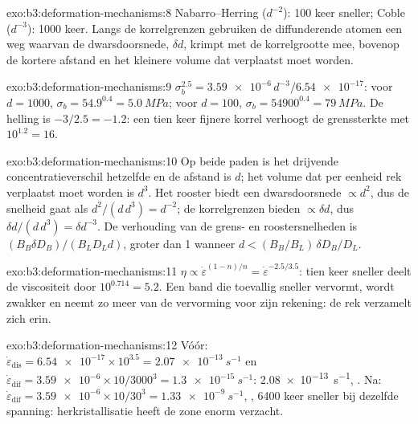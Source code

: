 \begin{solution}{exo:b3:deformation-mechanisms:8}
Nabarro--Herring ($d^{-2}$): 100 keer sneller; Coble ($d^{-3}$): 1000 keer.
Langs de korrelgrenzen gebruiken de diffunderende atomen een weg waarvan de dwarsdoorsnede, $\delta
d$, krimpt met de korrelgrootte mee, bovenop de kortere afstand en het kleinere
volume dat verplaatst moet worden.
\end{solution}

\begin{solution}{exo:b3:deformation-mechanisms:9}
$\sigma_b^{2.5} = \num{3.59e-6}\,d^{-3}/\num{6.54e-17}$: voor $d = 1000$,
$\sigma_b = 54.9^{0.4} = \qty{5.0}{MPa}$; voor $d = 100$, $\sigma_b =
\num{54900}^{0.4} = \qty{79}{MPa}$. De helling is $-3/2.5 = -1.2$: een tien keer
fijnere korrel verhoogt de grenssterkte met $10^{1.2} = 16$.
\end{solution}

\begin{solution}{exo:b3:deformation-mechanisms:10}
Op beide paden is het drijvende concentratieverschil hetzelfde en de
afstand is $d$; het volume dat per eenheid rek verplaatst moet worden is $d^3$. Het rooster
biedt een dwarsdoorsnede $\propto d^2$, dus de snelheid gaat als $d^2/(d\,d^3) =
d^{-2}$; de korrelgrenzen bieden $\propto\delta d$, dus $\delta d/(d\,d^3) = \delta
d^{-3}$. De verhouding van de grens- en roostersnelheden is $(B_B\delta D_B)/(B_LD_Ld)$,
groter dan 1 wanneer $d < (B_B/B_L)\,\delta D_B/D_L$.
\end{solution}

\begin{solution}{exo:b3:deformation-mechanisms:11}
$\eta \propto \dot\varepsilon^{(1-n)/n} = \dot\varepsilon^{-2.5/3.5}$: tien keer
sneller deelt de viscositeit door $10^{0.714} = 5.2$. Een band die toevallig
sneller vervormt, wordt zwakker en neemt zo meer van de vervorming voor zijn rekening: de rek
verzamelt zich erin.
\end{solution}

\begin{solution}{exo:b3:deformation-mechanisms:12}
Vóór: $\dot\varepsilon_{\mathrm{dis}} = \num{6.54e-17}\times10^{3.5} =
\qty{2.07e-13}{s^{-1}}$ en $\dot\varepsilon_{\mathrm{dif}} = \num{3.59e-6}
\times10/3000^3 = \qty{1.3e-15}{s^{-1}}$: \qty{2.08e-13}{s^{-1}}, .
Na: $\dot\varepsilon_{\mathrm{dif}} = \num{3.59e-6}\times10/30^3 =
\qty{1.33e-9}{s^{-1}}$, , \num{6400} keer sneller bij dezelfde
spanning: herkristallisatie heeft de zone enorm verzacht.
\end{solution}

